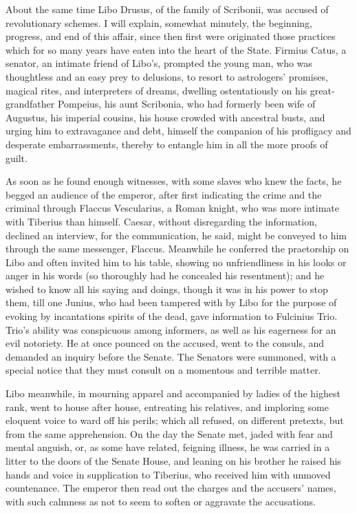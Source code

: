 
About the same time Libo Drusus, of the family of Scribonii, was accused of revolutionary schemes. I will explain, somewhat minutely, the beginning, progress, and end of this affair, since then first were originated those practices which for so many years have eaten into the heart of the State. Firmius Catus, a senator, an intimate friend of Libo's, prompted the young man, who was thoughtless and an easy prey to delusions, to resort to astrologers' promises, magical rites, and interpreters of dreams, dwelling ostentatiously on his great-grandfather Pompeius, his aunt Scribonia, who had formerly been wife of Augustus, his imperial cousins, his house crowded with ancestral busts, and urging him to extravagance and debt, himself the companion of his profligacy and desperate embarrassments, thereby to entangle him in all the more proofs of guilt.


As soon as he found enough witnesses, with some slaves who knew the facts, he begged an audience of the emperor, after first indicating the crime and the criminal through Flaccus Vescularius, a Roman knight, who was more intimate with Tiberius than himself. Caesar, without disregarding the information, declined an interview, for the communication, he said, might be conveyed to him through the same messenger, Flaccus. Meanwhile he conferred the praetorship on Libo and often invited him to his table, showing no unfriendliness in his looks or anger in his words (so thoroughly had he concealed his resentment); and he wished to know all his saying and doings, though it was in his power to stop them, till one Junius, who had been tampered with by Libo for the purpose of evoking by incantations spirits of the dead, gave information to Fulcinius Trio. Trio's ability was conspicuous among informers, as well as his eagerness for an evil notoriety. He at once pounced on the accused, went to the consuls, and demanded an inquiry before the Senate. The Senators were summoned, with a special notice that they must consult on a momentous and terrible matter.


Libo meanwhile, in mourning apparel and accompanied by ladies of the highest rank, went to house after house, entreating his relatives, and imploring some eloquent voice to ward off his perils; which all refused, on different pretexts, but from the same apprehension. On the day the Senate met, jaded with fear and mental anguish, or, as some have related, feigning illness, he was carried in a litter to the doors of the Senate House, and leaning on his brother he raised his hands and voice in supplication to Tiberius, who received him with unmoved countenance. The emperor then read out the charges and the accusers' names, with such calmness as not to seem to soften or aggravate the accusations.

